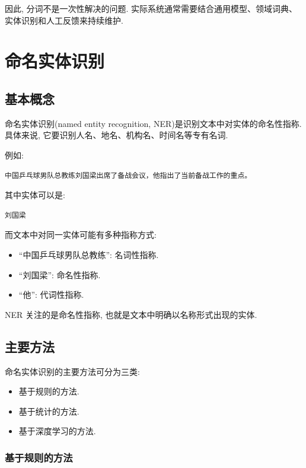 因此, 分词不是一次性解决的问题.
实际系统通常需要结合通用模型、领域词典、实体识别和人工反馈来持续维护.

\section{命名实体识别}


\subsection{基本概念}


命名实体识别(named entity recognition, NER)是识别文本中对实体的命名性指称.
具体来说, 它要识别人名、地名、机构名、时间名等专有名词.

例如:

\begin{Verbatim}[breaklines=true,breakanywhere=true,fontsize=\small]
中国乒乓球男队总教练刘国梁出席了备战会议，他指出了当前备战工作的重点。
\end{Verbatim}

其中实体可以是:

\begin{Verbatim}[breaklines=true,breakanywhere=true,fontsize=\small]
刘国梁
\end{Verbatim}

而文本中对同一实体可能有多种指称方式:

\begin{itemize}
\item “中国乒乓球男队总教练”: 名词性指称.
\item “刘国梁”: 命名性指称.
\item “他”: 代词性指称.
\end{itemize}

NER 关注的是命名性指称, 也就是文本中明确以名称形式出现的实体.

\subsection{主要方法}


命名实体识别的主要方法可分为三类:

\begin{itemize}
\item 基于规则的方法.
\item 基于统计的方法.
\item 基于深度学习的方法.
\end{itemize}

\subsubsection{基于规则的方法}


